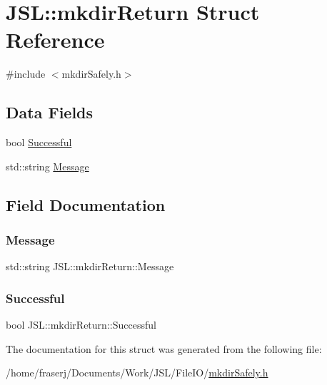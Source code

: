 \hypertarget{structJSL_1_1mkdirReturn}{}\section{J\+SL\+:\+:mkdir\+Return Struct Reference}
\label{structJSL_1_1mkdirReturn}


{\ttfamily \#include $<$mkdir\+Safely.\+h$>$}

\subsection*{Data Fields}
\begin{DoxyCompactItemize}
\item 
bool \hyperlink{structJSL_1_1mkdirReturn_a76abe5af61a20e13756f833b79782b7f}{Successful}
\item 
std\+::string \hyperlink{structJSL_1_1mkdirReturn_a64650d2f4b3d2ca29de3a4dcfdadbd0e}{Message}
\end{DoxyCompactItemize}


\subsection{Field Documentation}
\mbox{\label{structJSL_1_1mkdirReturn_a64650d2f4b3d2ca29de3a4dcfdadbd0e}} 
\subsubsection{\texorpdfstring{Message}{Message}}
{\footnotesize\ttfamily std\+::string J\+S\+L\+::mkdir\+Return\+::\+Message}

\mbox{\label{structJSL_1_1mkdirReturn_a76abe5af61a20e13756f833b79782b7f}} 
\subsubsection{\texorpdfstring{Successful}{Successful}}
{\footnotesize\ttfamily bool J\+S\+L\+::mkdir\+Return\+::\+Successful}



The documentation for this struct was generated from the following file\+:\begin{DoxyCompactItemize}
\item 
/home/fraserj/\+Documents/\+Work/\+J\+S\+L/\+File\+I\+O/\hyperlink{mkdirSafely_8h}{mkdir\+Safely.\+h}\end{DoxyCompactItemize}
